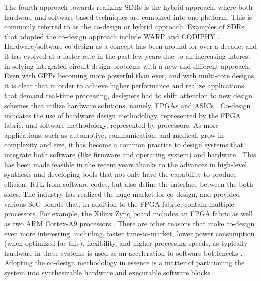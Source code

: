 The fourth approach towards realizing SDRs is the hybrid approach, where both hardware and software-based techniques are combined into one platform. This is commonly referred to as the co-design or hybrid approach. Examples of SDRs that adopted the co-design approach include WARP \cite{khattab2008a} and CODIPHY \cite{dutta2013a}. Hardware/software co-design as a concept has been around for over a decade, and it has evolved at a faster rate in the past few years due to an increasing interest in solving integrated circuit design problems with a new and different approach. Even with GPPs becoming more powerful than ever, and with multi-core designs, it is clear that in order to achieve higher performance and realize applications that demand real-time processing, designers had to shift attention to new design schemes that utilize hardware solutions, namely, FPGAs and ASICs \cite{wolf2003a} \cite{micheli2001a}. Co-design indicates the use of hardware design methodology, represented by the FPGA fabric, and software methodology, represented by processors. As more applications, such as automotive, communication, and medical, grow in complexity and size, it has become a common practice to design systems that integrate both software (like firmware and operating system) and hardware \cite{teich2012a}. This has been made feasible in the recent years thanks to the advances in high-level synthesis and developing tools that not only have the capability to produce efficient RTL from software codes, but also define the interface between the both sides. The industry has realized the huge market for co-design, and provided various SoC boards that, in addition to the FPGA fabric, contain multiple processors. For example, the Xilinx Zynq board \cite{unknown-k} includes an FPGA fabric as well as two ARM Cortex-A9 processors \cite{unknown-p}. There are other reasons that make co-design even more interesting, including, faster time-to-market, lower power consumption (when optimized for this), flexibility, and higher processing speeds, as typically hardware in these systems is used as an acceleration to software bottlenecks \cite{windh2015a}. Adopting the co-design methodology in essence is a matter of partitioning the system into synthesizable hardware and executable software blocks.

